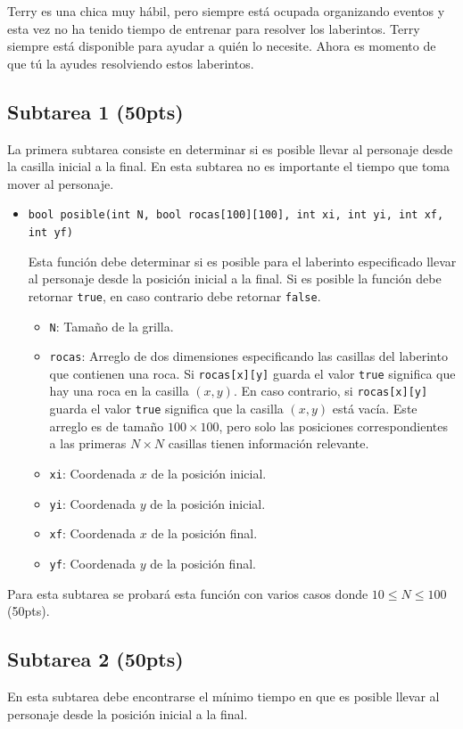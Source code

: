 \documentclass{oci}
\begin{document}
Terry es una chica muy hábil, pero siempre está ocupada organizando eventos y esta vez no ha tenido tiempo de entrenar para resolver los laberintos.
Terry siempre está disponible para ayudar a quién lo necesite.
Ahora es momento de que tú la ayudes resolviendo estos laberintos.

\subsection*{Subtarea 1 (50pts)}
La primera subtarea consiste en determinar si es posible llevar al personaje desde la casilla inicial a la final.
En esta subtarea no es importante el tiempo que toma mover al personaje.

\begin{itemize}
	\item \verb+bool posible(int N, bool rocas[100][100], int xi, int yi, int xf, int yf)+

Esta función debe determinar si es posible para el laberinto especificado llevar al personaje desde la posición inicial a la final.
  Si es posible la función debe retornar \texttt{true}, en caso contrario debe retornar \texttt{false}.
  \begin{itemize}
    \item \verb+N+: Tamaño de la grilla.
    \item \verb+rocas+: Arreglo de dos dimensiones especificando las casillas del laberinto que contienen una roca.
      Si \verb+rocas[x][y]+ guarda el valor \verb+true+ significa que hay una roca en la casilla $(x,y)$.
      En caso contrario, si \verb+rocas[x][y]+ guarda el valor \verb+true+ significa que la casilla $(x,y)$ está vacía.
      Este arreglo es de tamaño $100\times 100$, pero solo las posiciones correspondientes a las primeras $N\times N$ casillas tienen información relevante.
    \item \verb+xi+: Coordenada $x$ de la posición inicial.
    \item \verb+yi+: Coordenada $y$ de la posición inicial.
    \item \verb+xf+: Coordenada $x$ de la posición final.
    \item \verb+yf+: Coordenada $y$ de la posición final.
  \end{itemize}
\end{itemize}

Para esta subtarea se probará esta función con varios casos donde $10 \leq N\leq 100$ (50pts).

\subsection*{Subtarea 2 (50pts)}
En esta subtarea debe encontrarse el mínimo tiempo en que es posible llevar al personaje desde la posición inicial a la final.
\end{document}
